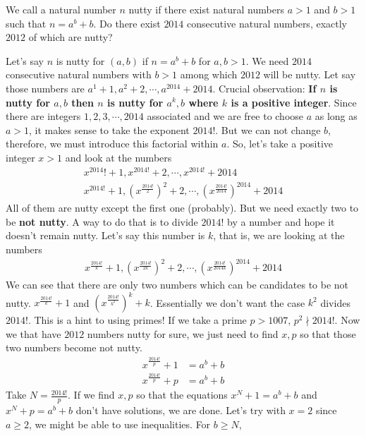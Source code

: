 \documentclass[problems.tex]{subfile}
\begin{document}
	\begin{problem}
		We call a natural number $n$ nutty if there exist natural numbers $a > 1$ and $b > 1$ such that $n = a^b + b$. Do there exist $2014$ consecutive natural numbers, exactly $2012$ of which are nutty?
	\end{problem}
	
	\begin{solution}
		Let's say $n$ is nutty for $(a,b)$ if $n=a^b+b$ for $a,b>1$. We need $2014$ consecutive natural numbers with $b>1$ among which $2012$ will be nutty. Let say those numbers are $a^1+1,a^2+2,\cdots,a^{2014}+2014$. Crucial observation: \textbf{If $n$ is nutty for $a,b$ then $n$ is nutty for $a^k,b$ where $k$ is a positive integer}. Since there are integers $1,2,3,\cdots,2014$ associated and we are free to choose $a $ as long as $a>1$, it makes sense to take the exponent $2014!$. But we can not change $b$, therefore, we must introduce this factorial within $a$. So, let's take a positive integer $x>1$ and look at the numbers 
			\begin{align*}
				x^{2014}!+1,x^{2014!}+2,\cdots,x^{2014!}+2014\\
				x^{2014!}+1,\left(x^{\frac{2014!}{2}}\right)^2+2,\cdots,\left(x^{\frac{2014!}{2014}}\right)^{2014}+2014
			\end{align*}
		All of them are nutty except the first one (probably). But we need exactly two to be \textbf{not nutty}. A way to do that is to divide $2014!$ by a number and hope it doesn't remain nutty. Let's say this number is $k$, that is, we are looking at the numbers 
			\begin{align*}
				x^{\frac{2014!}{k}}+1,\left(x^{\frac{2014!}{2k}}\right)^2+2,\cdots,\left(x^{\frac{2014!}{2014k}}\right)^{2014}+2014
			\end{align*}
		We can see that there are only two numbers which can be candidates to be not nutty. $x^{\frac{2014!}{k}}+1$ and $\left(x^{\frac{2014!}{k^2}}\right)^k+k$. Essentially we don't want the case $k^2$ divides $2014!$. This is a hint to using primes! If we take a prime $p>1007$, $p^2\nmid2014!$. Now we that have $2012$ numbers nutty for sure, we just need to find $x,p$ so that those two numbers become not nutty.
			\begin{align*}
				x^{\frac{2014!}{p}}+1 & = a^b+b\\
				x^{\frac{2014!}{p}}+p & = a^b+b
			\end{align*}
		Take $N = \frac{2014!}{p}$. If we find $x,p$ so that the equations $x^N+1=a^b+b$ and $x^N+p = a^b+b$ don't have solutions, we are done. Let's try with $x=2$ since $a\geq2$, we might be able to use inequalities. For $b\geq N$,

\end{solution}
\end{document}
